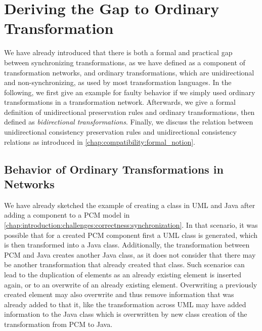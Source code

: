 \section{Deriving the Gap to Ordinary Transformation}

We have already introduced that there is both a formal and practical gap between synchronizing transformations, as we have defined as a component of transformation networks, and ordinary transformations, which are unidirectional and non-synchronizing, as used by most transformation languages.
In the following, we first give an example for faulty behavior if we simply used ordinary transformations in a transformation network.
Afterwards, we give a formal definition of unidirectional preservation rules and ordinary transformations, then defined as \emph{bidirectional transformations}.
Finally, we discuss the relation between unidirectional consistency preservation rules and unidirectional consistency relations as introduced in \autoref{chap:compatibility:formal_notion}.


\subsection{Behavior of Ordinary Transformations in Networks}
We have already sketched the example of creating a class in UML and Java after adding a component to a \gls{PCM} model in \autoref{chap:introduction:challenges:correctness:synchronization}.
In that scenario, it was possible that for a created \gls{PCM} component first a UML class is generated, which is then transformed into a Java class.
Additionally, the transformation between \gls{PCM} and Java creates another Java class, as it does not consider that there may be another transformation that already created that class.
Such scenarios can lead to the duplication of elements as an already existing element is inserted again, or to an overwrite of an already existing element.
Overwriting a previously created element may also overwrite and thus remove information that was already added to that it, like the transformation across UML may have added information to the Java class which is overwritten by new class creation of the transformation from PCM to Java.

